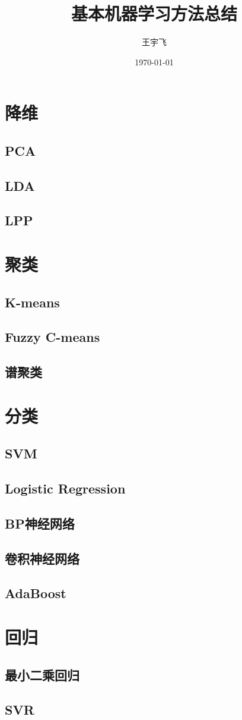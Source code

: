 \documentclass[lang=cn,11pt]{elegantpaper}
\title{基本机器学习方法总结}
\author{王宇飞}
\institute{西北工业大学电子信息学院}
\date{\today}
\begin{document}
\maketitle

\section{降维}
\subsection{PCA}
\subsection{LDA}
\subsection{LPP}
\section{聚类}
\subsection{K-means}
\subsection{Fuzzy C-means}
\subsection{谱聚类}
\section{分类}
\subsection{SVM}
\subsection{Logistic Regression}
\subsection{BP神经网络}
\subsection{卷积神经网络}
\subsection{AdaBoost}
\section{回归}
\subsection{最小二乘回归}
\subsection{SVR}

%
%
\end{document}
